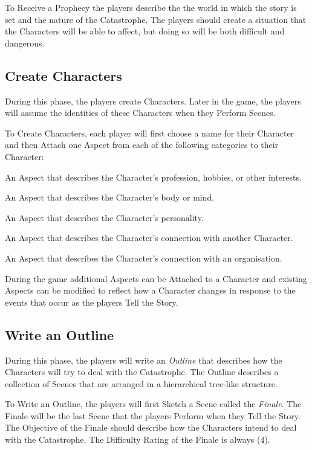 \documentclass[12pt, a5paper, parskip=half-]{scrartcl}
\begin{document}
To Receive a Prophecy the players describe the the world in which the story is set and the nature of the Catastrophe.
The players should create a situation that the Characters will be able to affect, but doing so will be both difficult and dangerous.

\newpage

\subsection*{Create Characters}
During this phase, the players create Characters.
Later in the game, the players will assume the identities of these Characters when they Perform Scenes.

To Create Characters, each player will first choose a name for their Character and then Attach one Aspect from each of the following categories to their Character:
\begin{description}[leftmargin=0pt]
   \item[Occupation]
     An Aspect that describes the Character's profession, hobbies, or other interests.
   \item[Physical or Mental Characteristic]
     An Aspect that describes the Character's body or mind.
   \item[Psychological Characteristic]
     An Aspect that describes the Character's personality.
   \item[Relationship]
     An Aspect that describes the Character's connection with another Character.
   \item[Affiliation]
     An Aspect that describes the Character's connection with an organisation.
\end{description}

\bigskip

During the game additional Aspects can be Attached to a Character and existing Aspects can be modified to reflect how a Character changes in response to the events that occur as the players Tell the Story.

\newpage

\subsection*{Write an Outline}
During this phase, the players will write an \emph{Outline} that describes how the Characters will try to deal with the Catastrophe.
The Outline describes a collection of Scenes that are arranged in a hierarchical tree-like structure.

To Write an Outline, the players will first Sketch a Scene called the \emph{Finale}.
The Finale will be the last Scene that the players Perform when they Tell the Story.
The Objective of the Finale should describe how the Characters intend to deal with the Catastrophe.
The Difficulty Rating of the Finale is always (4).
\end{document}
